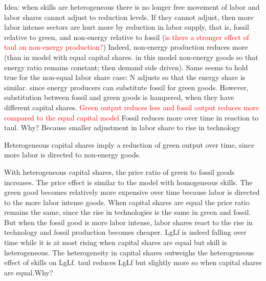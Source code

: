 \documentclass[12pt]{article}
\newcommand{\tr}[1]{\textcolor{red}{#1}}
\begin{document}
Idea: when skills are heterogeneous there is no longer free movement of labor and labor shares cannot adjust to reduction levels. If they cannot adjust, then more labor intense sectors are hurt more by reduction in labor supply, that is, fossil relative to green, and non-energy relative to fossil (\tr{is there a stronger effect of taul on non-energy production?}) Indeed, non-energy production reduces more (than in model with equal capital shares. in this model non-energy goods so that energy ratio remains constant; then demand side driven). Same seems to hold true for the non-equal labor share case: N adjusts so that the energy share is similar. since energy producers can substitute fossil for green goods. However, substitution between fossil and green goods is hampered, when they have different capital shares. 
\tr{Green output reduces less and fossil output reduces more compared to the equal capital model} Fossil  reduces more over time in reaction to taul. Why? Because smaller adjustment in labor share to rise in technology 

Heterogeneous capital shares imply a reduction of green output over time, since more labor is directed to non-energy goods. 

With heterogeneous capital shares, the price ratio of green to fossil goods increases. The price effect is similar to the model with homogeneous skills. The green good becomes relatively more expensive over time because labor is directed to the more labor intense goods.  When capital shares are equal the price ratio remains the same, since the rise in technologies is the same in green and fossil. But when the fossil good is more labor intense, labor shares react to the rise in technology and fossil production becomes cheaper. LgLf is indeed falling over time while it is at most rising when capital shares are equal but skill is heterogeneous. The heterogeneity in capital shares outweighs the heterogeneous effect of skills on LgLf. taul reduces LgLf but slightly more so when capital shares are equal.Why? 
\end{document}
